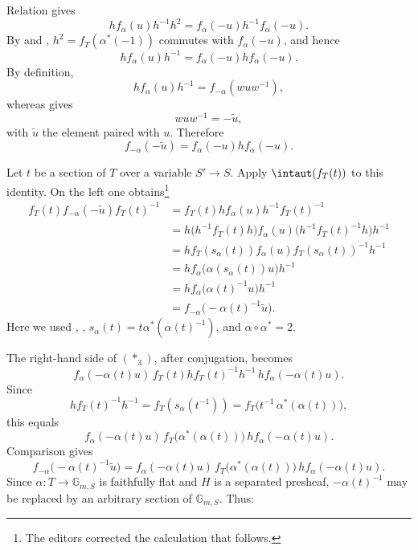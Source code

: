 Relation \textup{} gives
\[
 h f_\alpha(u)h^{-1}h^2
 =
 f_\alpha(-u)h^{-1}f_\alpha(-u).
\]
By \textup{} and \textup{},
\(h^2=f_T(\alpha^\ast(-1))\) commutes with \(f_\alpha(-u)\), and
hence
\[
 h f_\alpha(u)h^{-1}
 =
 f_\alpha(-u)h f_\alpha(-u).
\]
By definition,
\[
 h f_\alpha(u)h^{-1}=f_{-\alpha}(wuw^{-1}),
\]
whereas  gives
\begin{equation}
\tag{\(\ast_2\)}\label{sga3:xx:theorem:6-2:equation:ast-2}
 wuw^{-1}=-\widetilde u,
\end{equation}
with \(\widetilde u\) the element paired with \(u\).  Therefore
\begin{equation}
\tag{\(\ast_3\)}\label{sga3:xx:theorem:6-2:equation:ast-3}
 f_{-\alpha}(-\widetilde u)
 =
 f_\alpha(-u)h f_\alpha(-u).
\end{equation}

Let \(t\) be a section of \(T\) over a variable \(S'\to S\).
Apply \(\intaut(f_T(t))\) to this identity.  On the left one
obtains\footnote{The editors corrected the calculation that follows.}
\[
\begin{aligned}
 f_T(t)f_{-\alpha}(-\widetilde u)f_T(t)^{-1}
 &=
 f_T(t)h f_\alpha(u)h^{-1}f_T(t)^{-1}\\
 &=
 h\bigl(h^{-1}f_T(t)h\bigr)f_\alpha(u)
   \bigl(h^{-1}f_T(t)^{-1}h\bigr)h^{-1}\\
 &=
 h f_T(s_\alpha(t))f_\alpha(u)
   f_T(s_\alpha(t))^{-1}h^{-1}\\
 &=
 h f_\alpha\bigl(\alpha(s_\alpha(t))u\bigr)h^{-1}\\
 &=
 h f_\alpha\bigl(\alpha(t)^{-1}u\bigr)h^{-1}\\
 &=
 f_{-\alpha}\bigl(-\alpha(t)^{-1}\widetilde u\bigr).
\end{aligned}
\]
Here we used \textup{}, \textup{},
\(s_\alpha(t)=t\alpha^\ast(\alpha(t)^{-1})\), and
\(\alpha\circ\alpha^\ast=2\).

The right-hand side of \((\ast_3)\), after conjugation, becomes
\[
 f_\alpha(-\alpha(t)u)\,
 f_T(t)h f_T(t)^{-1}h^{-1}\,
 h f_\alpha(-\alpha(t)u).
\]
Since
\[
 h f_T(t)^{-1}h^{-1}
 =f_T(s_\alpha(t^{-1}))
  =f_T\bigl(t^{-1}\,\alpha^\ast(\alpha(t))\bigr),
\]
this equals
\[
 f_\alpha(-\alpha(t)u)\,
 f_T\bigl(\alpha^\ast(\alpha(t))\bigr)\,
 h f_\alpha(-\alpha(t)u).
\]
Comparison gives
\[
 f_{-\alpha}\bigl(-\alpha(t)^{-1}\widetilde u\bigr)
 =
 f_\alpha(-\alpha(t)u)\,
 f_T\bigl(\alpha^\ast(\alpha(t))\bigr)\,
 h f_\alpha(-\alpha(t)u).
\]
Since \(\alpha\colon T\to\mathbb G_{m,S}\) is faithfully flat and
\(H\) is a separated presheaf, \(-\alpha(t)^{-1}\) may be replaced
by an arbitrary section of \(\mathbb G_{m,S}\).  Thus:

